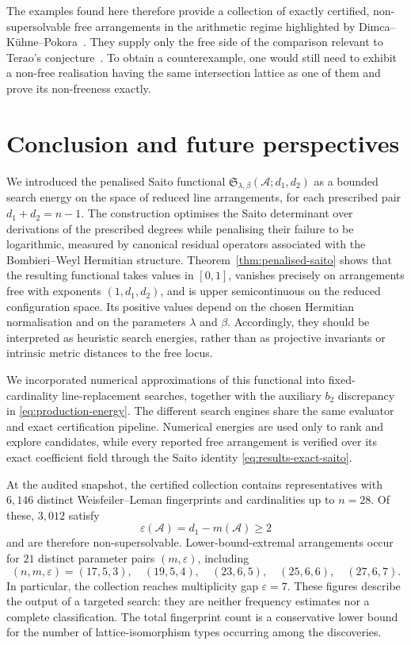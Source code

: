 \documentclass[pdflatex,sn-mathphys-num]{sn-jnl}%
\renewcommand{\epsilon}{\varepsilon}
\theoremstyle{remark}
\theoremstyle{definition}
\begin{document}
The examples found here therefore provide a collection of exactly certified, non-supersolvable free arrangements in the arithmetic regime highlighted by Dimca--K\"uhne--Pokora~\cite{Dimca2026freelinearrangementslow}. They supply only the free side of the comparison relevant to Terao's conjecture~\cite{Terao80}. To obtain a counterexample, one would still need to exhibit a non-free realisation having the same intersection lattice as one of them and prove its non-freeness exactly.

\section{Conclusion and future perspectives}
\label{sec:conclusion}
We introduced the penalised Saito functional
$\mathfrak S_{\lambda,\beta}(\mathcal{A};d_1,d_2)$ as a bounded search energy
on the space of reduced line arrangements, for each prescribed pair
$d_1+d_2=n-1$. The construction optimises the Saito determinant over
derivations of the prescribed degrees while penalising their failure to be
logarithmic, measured by canonical residual operators associated with the
Bombieri--Weyl Hermitian structure. Theorem~\ref{thm:penalised-saito} shows
that the resulting functional takes values in $[0,1]$, vanishes precisely on
arrangements free with exponents $(1,d_1,d_2)$, and is upper semicontinuous
on the reduced configuration space. Its positive values depend on the chosen
Hermitian normalisation and on the parameters $\lambda$ and $\beta$.
Accordingly, they should be interpreted as heuristic search energies, rather
than as projective invariants or intrinsic metric distances to the free
locus.

We incorporated numerical approximations of this functional into fixed-cardinality line-replacement searches, together with the auxiliary $b_2$ discrepancy in \eqref{eq:production-energy}. The different search engines share the same evaluator and exact certification pipeline. Numerical energies are used only to rank and explore candidates, while every reported free arrangement is verified over its exact coefficient field through the Saito identity \eqref{eq:results-exact-saito}.

At the audited snapshot, the certified collection contains representatives with $6{,}146$ distinct Weisfeiler--Leman fingerprints and cardinalities up to $n=28$. Of these, $3{,}012$ satisfy
\[
\epsilon(\mathcal{A})=d_1-m(\mathcal{A})\geq2
\]
and are therefore non-supersolvable. Lower-bound-extremal arrangements occur for $21$ distinct parameter pairs $(m,\epsilon)$, including
\[
(n,m,\epsilon)
=
(17,5,3),\quad
(19,5,4),\quad
(23,6,5),\quad
(25,6,6),\quad
(27,6,7).
\]
In particular, the collection reaches multiplicity gap $\epsilon=7$. These figures describe the output of a targeted search: they are neither frequency estimates nor a complete classification. The total fingerprint count is a conservative lower bound for the number of lattice-isomorphism types occurring among the discoveries.
\end{document}
